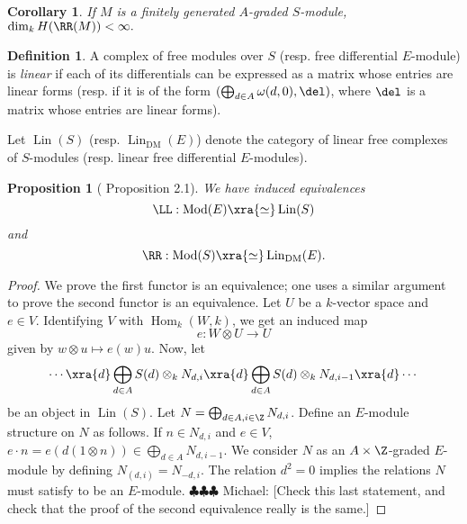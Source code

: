 \documentclass[12pt]{amsart}
\newtheorem{prop}[lemma]{Proposition}
\newtheorem{cor}[lemma]{Corollary}
\theoremstyle{definition}
\newtheorem{defn}[lemma]{Definition}
\theoremstyle{remark}
\newtheorem{rem}[lemma]{Remark}
\newcommand{\Hom}{\operatorname{Hom}} %
\newcommand{\daniel}[1]{{\color{blue} \sf $\clubsuit\clubsuit\clubsuit$ Daniel: [#1]}}
\newcommand{\michael}[1]{{\color{red} \sf $\clubsuit\clubsuit\clubsuit$ Michael: [#1]}}
\def\on{\operatorname}
\def\DM{\operatorname{DM}}
\def\Mod{\operatorname{Mod}}
\def\o{\omega}
\begin{document}
\begin{cor}\label{cor:RM high degree}
If $M$ is a finitely generated $A$-graded $S$-module, $\dim_k H(\RR(M)) < \infty.$
\end{cor}



\begin{defn}
A complex of free modules over $S$ (resp. free differential $E$-module) is \emph{linear} if each of its differentials can be expressed as a matrix whose entries are linear forms (resp. if it is of the form $(\bigoplus_{d \in A} \o(d, 0), \del)$, where $\del$ is a matrix whose entries are linear forms). 

Let $\on{Lin}(S)$ (resp. $\on{Lin}_{\DM}(E)$) denote the category of linear free complexes of $S$-modules (resp. linear free differential $E$-modules).
\end{defn}


\begin{prop}[\cite{EFS} Proposition 2.1] We have induced equivalences
$$
\LL :  \Mod(E) \xra{\simeq} \on{Lin}(S)
$$
and
$$
\RR :\Mod(S) \xra{\simeq} \on{Lin}_{\DM}(E).
$$
\end{prop}


\begin{proof}
We prove the first functor is an equivalence; one uses a similar argument to prove the second functor is an equivalence. Let $U$ be a $k$-vector space and $e \in V$. Identifying $V$ with $\Hom_k(W, k)$, we get an induced map
$$
e : W \otimes U \to U
$$
given by $w \otimes u \mapsto e(w)u$. Now, let
$$
\cdots \xra{d} \bigoplus_{d \in A}S(d)  \otimes_k N_{d,i}  \xra{d} \bigoplus_{d \in A} S(d) \otimes_k N_{d, i-1} \xra{d} \cdots
$$
be an object in $\on{Lin}(S)$. Let $N = \bigoplus_{d \in A, i \in \Z} N_{d, i}$. Define an $E$-module structure on $N$ as follows. If $n \in N_{d,i}$ and $e \in V$, $e \cdot n = e(d(1 \otimes n)) \in \bigoplus_{d \in A} N_{d, i-1}$. We consider $N$ as an $A \times \Z$-graded $E$-module by defining $N_{(d, i)} = N_{-d, i}$. The relation $d^2 = 0$ implies the relations $N$ must satisfy to be an $E$-module. \michael{Check this last statement, and check that the proof of the second equivalence really is the same.}
\end{proof}
\end{document}
